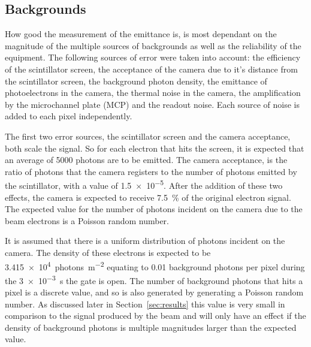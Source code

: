 \subsection{Backgrounds}

How good the measurement of the emittance is, is most dependant on the magnitude
of the multiple sources of backgrounds as well as the reliability of the
equipment. The following sources of error were taken into account: the
efficiency of the scintillator screen, the acceptance of the camera due to it's
distance from the scintillator screen, the background photon density, the
emittance of photoelectrons in the camera, the thermal noise in the camera, the
amplification by the microchannel plate (MCP) and the readout noise.  Each
source of noise is added to each pixel independently.


The first two error sources, the scintillator screen and the camera acceptance,
both scale the signal. So for each electron that hits the screen, it is
expected that an average of \num{5000} photons are to be emitted. The
camera acceptance, is the ratio of photons that the camera registers to the
number of photons emitted by the scintillator, with a value of \num{1.5e-5}.
After the addition of these two effects, the camera is expected to receive
\SI{7.5}{\percent} of the original electron signal. The expected value for the
number of photons incident on the camera due to the beam electrons is a Poisson
random number.

It is assumed that there is a uniform distribution of photons incident on the
camera. The density of these electrons is expected to be
\SI{3.415e4}{photons\per\meter\squared} equating to \num{0.01} background
photons per pixel during the \SI{3e-3}{\second} the gate is open. The number of
background photons that hits a pixel is a discrete value, and so is also
generated by generating a Poisson random number.  As discussed later in
Section~\ref{sec:results} this value is very small in comparison to the signal
produced by the beam and will only have an effect if the density of background
photons is multiple magnitudes larger than the expected value.

